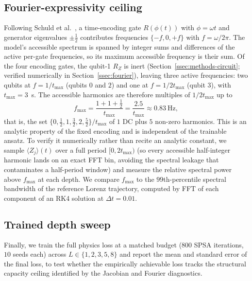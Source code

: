 \documentclass[a4paper,12pt]{iopart}
\newcommand{\Zexp}[1]{\langle Z_{#1}\rangle}
\begin{document}
\subsection{Fourier-expressivity ceiling}
\label{ssec:methods-fourier}

Following Schuld et al.~\cite{schuld2021effect}, a time-encoding gate
$R(\phi(t))$ with $\phi=\omega t$ and generator eigenvalues $\pm\tfrac12$
contributes frequencies $\{-f,0,+f\}$ with $f=\omega/2\pi$. The model's
accessible spectrum is spanned by integer sums and differences of the active
per-gate frequencies, so its maximum accessible frequency is their sum. Of the
four encoding gates, the qubit-1 $R_Z$ is inert (Section~\ref{ssec:methods-circuit};
verified numerically in Section~\ref{ssec:fourier}), leaving three active
frequencies: two qubits at $f=1/t_{\max}$ (qubits $0$ and $2$) and one at
$f=1/2t_{\max}$ (qubit $3$), with $t_{\max}=3$~s. The accessible harmonics are
therefore multiples of $1/2t_{\max}$ up to
\begin{equation}
  f_{\max} = \frac{1+1+\tfrac12}{t_{\max}} = \frac{2.5}{t_{\max}}
           \approx 0.83~\text{Hz},
  \label{eq:fmax}
\end{equation}
that is, the set $\{0,\tfrac12,1,\tfrac32,2,\tfrac52\}/t_{\max}$ of $1$ DC plus
$5$ non-zero harmonics. This is an analytic property of the fixed encoding and
is independent of the trainable ansatz. To verify it numerically rather than
recite an analytic constant, we sample $\Zexp{j}(t)$ over a full period
$[0,2t_{\max})$ (so every accessible half-integer harmonic lands on an exact FFT
bin, avoiding the spectral leakage that contaminates a half-period window) and
measure the relative spectral power above $f_{\max}$ at each depth. We compare
$f_{\max}$ to the $99$th-percentile spectral bandwidth of the reference Lorenz
trajectory, computed by FFT of each component of an RK4 solution at $\Delta t=0.01$.

\subsection{Trained depth sweep}
\label{ssec:methods-capcurve}

Finally, we train the full physics loss at a matched budget ($800$ SPSA
iterations, $10$ seeds each) across $L\in\{1,2,3,5,8\}$ and report the mean and
standard error of the final loss, to test whether the empirically achievable
loss tracks the structural capacity ceiling identified by the Jacobian and
Fourier diagnostics.
\end{document}

